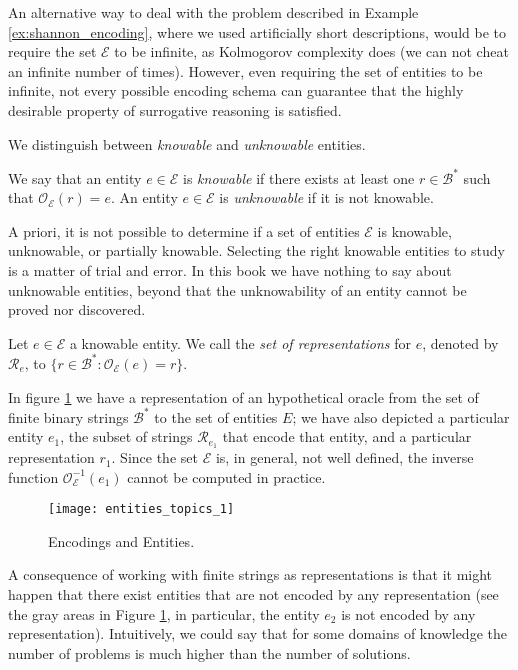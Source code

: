 An alternative way to deal with the problem described in Example \ref{ex:shannon_encoding}, where we used artificially short descriptions, would be to require the set $\mathcal{E}$ to be infinite, as Kolmogorov complexity does (we can not cheat an infinite number of times). However, even requiring the set of entities to be infinite, not every possible encoding schema can guarantee that the highly desirable property of surrogative reasoning is satisfied.

We distinguish between \emph{knowable} and \emph{unknowable} entities.

\begin{definition}
We say that an entity $e \in \mathcal{E}$ is \emph{knowable} if there exists at least one $r \in \mathcal{B}^\ast$ such that $\mathcal{O}_\mathcal{E}(r) = e$. An entity $e \in \mathcal{E}$ is \emph{unknowable} if it is not knowable.
\end{definition}

A priori, it is not possible to determine if a set of entities $\mathcal{E}$ is knowable, unknowable, or partially knowable. Selecting the right knowable entities to study is a matter of trial and error. In this book we have nothing to say about unknowable entities, beyond that the unknowability of an entity cannot be proved nor discovered.

\begin{definition}
Let $e \in \mathcal{E}$ a knowable entity. We call the \emph{set of representations} for $e$, denoted by $\mathcal{R}_e$, to $\{ r \in \mathcal{B}^\ast : \mathcal{O}_\mathcal{E} (e) = r \}$.
\end{definition}

In figure \ref{fig:entities_topics_1} we have a representation of an hypothetical oracle from the set of finite binary strings $\mathcal{B}^\ast$ to the set of entities $E$; we have also depicted a particular entity $e_1$, the subset of strings $\mathcal{R}_{e_1}$ that encode that entity, and a particular representation $r_1$. Since the set $\mathcal{E}$ is, in general, not well defined, the inverse function $\mathcal{O}_\mathcal{E}^{-1}(e_1)$ cannot be computed in practice.

\begin{figure}[h]
\centering\texttt{[image: entities\_topics\_1]}
\caption{\label{fig:entities_topics_1}Encodings and Entities.}
\end{figure}

A consequence of working with finite strings as representations is that it might happen that there exist entities that are not encoded by any representation (see the gray areas in Figure \ref{fig:entities_topics_1}, in particular, the entity $e_2$ is not encoded by any representation). Intuitively, we could say that for some domains of knowledge the number of problems is much higher than the number of solutions.

